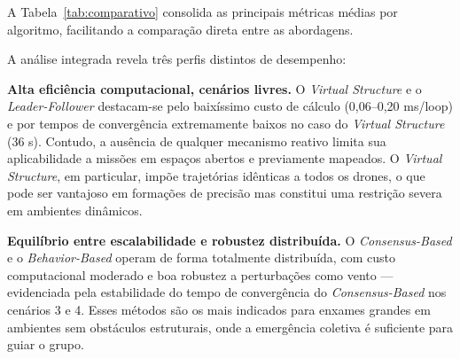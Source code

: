 A Tabela~\ref{tab:comparativo} consolida as principais métricas médias por algoritmo, facilitando a comparação direta entre as abordagens.

\begin{table}[ht]
\centering
\caption{Comparativo geral das métricas médias por algoritmo (cenários em que houve execução completa).}
\label{tab:comparativo}
\renewcommand{\arraystretch}{1.15}
\end{table}

A análise integrada revela três perfis distintos de desempenho:

\textbf{Alta eficiência computacional, cenários livres.} O \textit{Virtual Structure} e o \textit{Leader-Follower} destacam-se pelo baixíssimo custo de cálculo (0,06--0,20 ms/loop) e por tempos de convergência extremamente baixos no caso do \textit{Virtual Structure} (36 s). Contudo, a ausência de qualquer mecanismo reativo limita sua aplicabilidade a missões em espaços abertos e previamente mapeados. O \textit{Virtual Structure}, em particular, impõe trajetórias idênticas a todos os drones, o que pode ser vantajoso em formações de precisão mas constitui uma restrição severa em ambientes dinâmicos.

\textbf{Equilíbrio entre escalabilidade e robustez distribuída.} O \textit{Consensus-Based} e o \textit{Behavior-Based} operam de forma totalmente distribuída, com custo computacional moderado e boa robustez a perturbações como vento — evidenciada pela estabilidade do tempo de convergência do \textit{Consensus-Based} nos cenários 3 e 4. Esses métodos são os mais indicados para enxames grandes em ambientes sem obstáculos estruturais, onde a emergência coletiva é suficiente para guiar o grupo.


